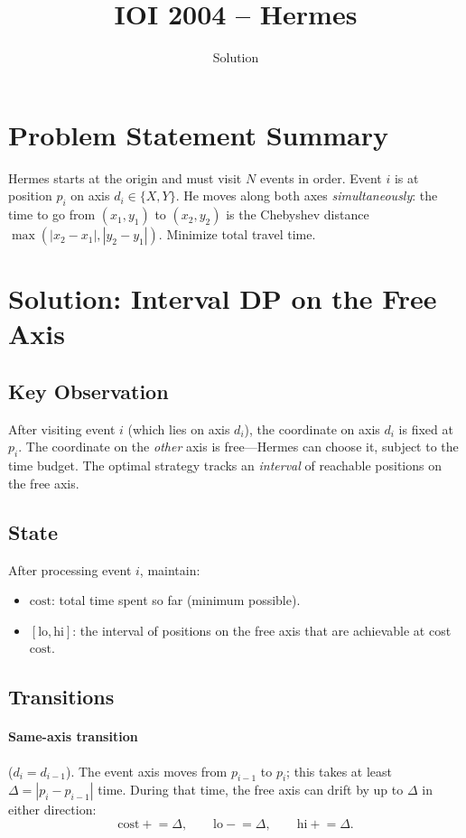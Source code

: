 \documentclass[11pt,a4paper]{article}
\title{IOI 2004 -- Hermes}
\author{Solution}
\date{}
\begin{document}
\maketitle

\section{Problem Statement Summary}
Hermes starts at the origin and must visit $N$ events in order. Event
$i$ is at position $p_i$ on axis $d_i \in \{X, Y\}$. He moves along
both axes \emph{simultaneously}: the time to go from $(x_1, y_1)$ to
$(x_2, y_2)$ is the Chebyshev distance
$\max(|x_2 - x_1|, |y_2 - y_1|)$. Minimize total travel time.

\section{Solution: Interval DP on the Free Axis}

\subsection{Key Observation}
After visiting event $i$ (which lies on axis $d_i$), the coordinate on
axis $d_i$ is fixed at $p_i$. The coordinate on the \emph{other} axis
is free---Hermes can choose it, subject to the time budget. The optimal
strategy tracks an \emph{interval} of reachable positions on the free
axis.

\subsection{State}
After processing event $i$, maintain:
\begin{itemize}
  \item $\mathrm{cost}$: total time spent so far (minimum possible).
  \item $[\mathrm{lo}, \mathrm{hi}]$: the interval of positions on the
        free axis that are achievable at cost $\mathrm{cost}$.
\end{itemize}

\subsection{Transitions}
\paragraph{Same-axis transition} ($d_i = d_{i-1}$).
The event axis moves from $p_{i-1}$ to $p_i$; this takes at least
$\Delta = |p_i - p_{i-1}|$ time. During that time, the free axis can
drift by up to $\Delta$ in either direction:
\[
  \mathrm{cost} \mathrel{+}= \Delta, \qquad
  \mathrm{lo} \mathrel{-}= \Delta, \qquad
  \mathrm{hi} \mathrel{+}= \Delta.
\]
\end{document}
